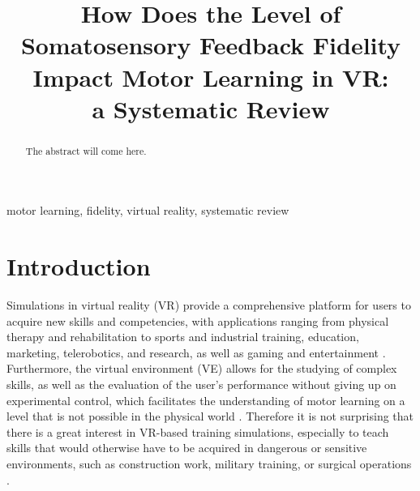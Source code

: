 \documentclass[conference]{IEEEtran}
\begin{document}
\title{How Does the Level of Somatosensory Feedback Fidelity Impact Motor Learning in VR: \\a Systematic Review}

\author{
\and
{}
\and
{}
}

\maketitle

\begin{abstract}
The abstract will come here. \\

\end{abstract}

\begin{IEEEkeywords}
motor learning, fidelity, virtual reality, systematic review
\end{IEEEkeywords}

\section{Introduction}

Simulations in virtual reality (VR) provide a comprehensive platform for users to acquire new skills and competencies, with applications ranging from physical therapy and rehabilitation to sports and industrial training, education, marketing, telerobotics, and research, as well as gaming and entertainment \cite{Wu2023TrainingReality, Oagaz2022PerformanceReality}. Furthermore, the virtual environment (VE) allows for the studying of complex skills, as well as the evaluation of the user's performance without giving up on experimental control, which facilitates the understanding of motor learning on a level that is not possible in the physical world \cite{Harris2021ExploringSimulator, Levac2019LearningReview}. Therefore it is not surprising that there is a great interest in VR-based training simulations, especially to teach skills that would otherwise have to be acquired in dangerous or sensitive environments, such as construction work, military training, or surgical operations \cite{Adami2021EffectivenessTeleoperation, Lele2013VirtualUtility, Qi2021VirtualScenario}.
\end{document}
